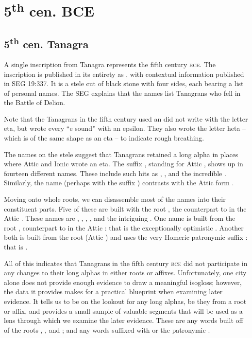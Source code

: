 \section{5\textsuperscript{th} cen.  BCE}

\subsection{5\textsuperscript{th} cen.  Tanagra}

A single inscription from Tanagra represents the fifth century \textsc{bce}. 
The inscription is published in its entirety as , 
with contextual information published in SEG 19:337.\autocite{SEG} 
It is a stele cut of black stone with four sides, 
each bearing a list of personal names. 
The SEG explains that the names list Tanagrans who fell in the Battle of Delion. 

Note that the Tanagrans in the fifth century used an did not write with the letter eta, 
but wrote every ``e sound'' with an epsilon.
They also wrote the letter heta -- 
which is of the same shape as an eta -- 
to indicate rough breathing. 

The names on the stele suggest that Tanagrans retained a long alpha in places where Attic and Ionic wrote an eta. 
The suffix ,
standing for Attic ,
shows up in fourteen different names. 
These include such hits as ,
,
and the incredible .
Similarly, the name  (perhaps with the suffix \autocite[861.11]{Smyth}) 
contrasts with the Attic form .

Moving onto whole roots, we can disassemble most of the names into their constituent parts. 
Five of these are built with the root , 
the counterpart to  in the Attic .
These names are ,
,
,
,
and the intriguing .
One name is built from the root , counterpart to  in the Attic :
that is the exceptionally optimistic .
Another both is built from the root  (Attic )
and uses the very Homeric patronymic suffix : that is .

All of this indicates that Tanagrans in the fifth century \textsc{bce} did not participate in any changes to their long alphas in either roots or affixes. 
Unfortunately, 
one city alone does not provide enough evidence to draw a meaningful isogloss;
however,
the data it provides makes for a practical blueprint when examining later evidence. 
It tells us to be on the lookout for any long alphas, 
be they from a root or affix, 
and provides a small sample of valuable segments that will be used as a lens through which we examine the later evidence. 
These are any words built off of the roots ,
,
and ;
and any words suffixed with  or the patronymic .
